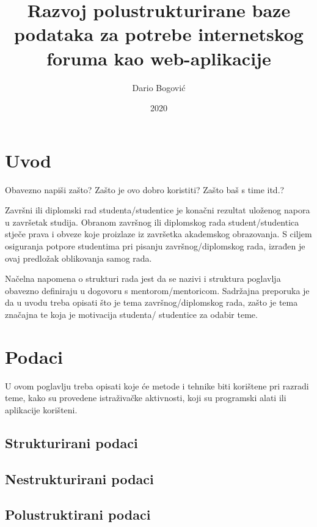 \documentclass{foi}
\title{Razvoj polustrukturirane baze podataka za potrebe internetskog foruma kao web-aplikacije}
\author{Dario Bogović}
\date{2020}
\begin{document}
\maketitle

\tableofcontents

\pagestyle{plain}
\chapter{Uvod}

Obavezno napiši zašto? Zašto je ovo dobro koristiti? Zašto baš s time itd.?

Završni ili diplomski rad studenta/studentice je konačni rezultat uloženog napora u završetak studija. Obranom završnog ili diplomskog rada student/studentica stječe prava i obveze koje proizlaze iz završetka akademskog obrazovanja. S ciljem osiguranja potpore studentima pri pisanju završnog/diplomskog rada, izrađen je ovaj predložak oblikovanja samog rada.

Načelna napomena o strukturi rada jest da se nazivi i struktura poglavlja obavezno definiraju u dogovoru s mentorom/mentoricom. Sadržajna preporuka je da u uvodu treba opisati što je tema završnog/diplomskog rada, zašto je tema značajna te koja je motivacija studenta/ studentice za odabir teme. 

\chapter{Podaci}

U ovom poglavlju treba opisati koje će metode i tehnike biti korištene pri razradi teme, kako su provedene istraživačke aktivnosti, koji su programski alati ili aplikacije korišteni.

\section{Strukturirani podaci}

\lipsum[1]

\section{Nestrukturirani podaci}

\lipsum[1]

\section{Polustruktirani podaci}
\end{document}
